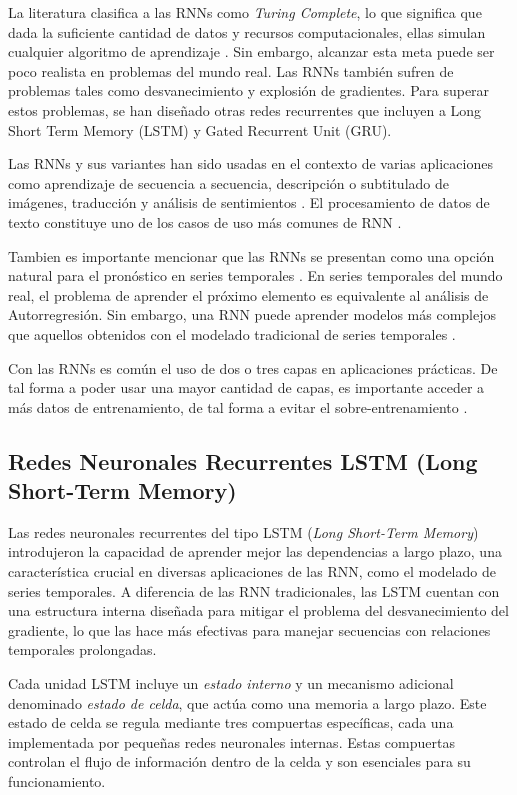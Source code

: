 La literatura clasifica a las RNNs como \textit{Turing Complete}, lo que significa que dada la suficiente cantidad de datos y recursos computacionales, ellas simulan cualquier algoritmo de aprendizaje \cite{libro-charu}. Sin embargo, alcanzar esta meta puede ser poco realista en problemas del mundo real. Las RNNs también sufren de problemas tales como desvanecimiento y explosión de gradientes. Para superar estos problemas, se han diseñado otras redes recurrentes que incluyen a Long Short Term Memory (LSTM) y Gated Recurrent Unit (GRU).

Las RNNs y sus variantes han sido usadas en el contexto de varias aplicaciones como aprendizaje de secuencia a secuencia, descripción o subtitulado de imágenes, traducción y análisis de sentimientos \cite{libro-charu}. El procesamiento de datos de texto constituye uno de los casos de uso más comunes de RNN \cite{libro-charu}.

Tambien es importante mencionar que las RNNs se presentan como una opción natural para el pronóstico en series temporales \cite{libro-charu}. En series temporales del mundo real, el problema de aprender el próximo elemento es equivalente al análisis de Autorregresión.
Sin embargo, una RNN puede aprender modelos más complejos que aquellos obtenidos
con el modelado tradicional de series temporales \cite{libro-charu}.

Con las RNNs es común el uso de dos o tres capas en aplicaciones prácticas. De tal forma a poder usar una mayor cantidad de capas, es importante acceder a más datos de entrenamiento, de tal forma a evitar el sobre-entrenamiento \cite{libro-charu}.

\subsection{Redes Neuronales Recurrentes LSTM (Long Short-Term Memory)}

Las redes neuronales recurrentes del tipo LSTM (\textit{Long Short-Term Memory}) introdujeron la capacidad de aprender mejor las dependencias a largo plazo, una característica crucial en diversas aplicaciones de las RNN, como el modelado de series temporales. A diferencia de las RNN tradicionales, las LSTM cuentan con una estructura interna diseñada para mitigar el problema del desvanecimiento del gradiente, lo que las hace más efectivas para manejar secuencias con relaciones temporales prolongadas.

Cada unidad LSTM incluye un \textit{estado interno} y un mecanismo adicional denominado \textit{estado de celda}, que actúa como una memoria a largo plazo. Este estado de celda se regula mediante tres compuertas específicas, cada una implementada por pequeñas redes neuronales internas. Estas compuertas controlan el flujo de información dentro de la celda y son esenciales para su funcionamiento.


